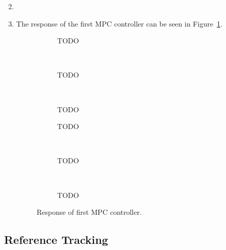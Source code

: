 \documentclass[11pt]{article}
\begin{document}
\begin{enumerate}
    \setcounter{enumi}{1}
    \item

    \item The response of the first MPC controller can be seen in
    Figure~\ref{fig:1st_mpc_controller}.
    \begin{figure}[ht]
        \centering
        \begin{subfigure}[c]{0.3\linewidth}
            \centering
            \caption{TODO}
        \end{subfigure}
        ~
        \begin{subfigure}[c]{0.3\linewidth}
            \centering
            \caption{TODO}
        \end{subfigure}
        ~
        \begin{subfigure}[c]{0.3\linewidth}
            \centering
            \caption{TODO}
        \end{subfigure}

        \begin{subfigure}[c]{0.3\linewidth}
            \centering
            \caption{TODO}
        \end{subfigure}
        ~
        \begin{subfigure}[c]{0.3\linewidth}
            \centering
            \caption{TODO}
        \end{subfigure}
        ~
        \begin{subfigure}[c]{0.3\linewidth}
            \centering
            \caption{TODO}
        \end{subfigure}
        \caption{Response of first MPC controller.}
        \label{fig:1st_mpc_controller}
    \end{figure}
\end{enumerate}



\subsection*{Reference Tracking} %
\label{sub:reference_tracking}
\end{document}
